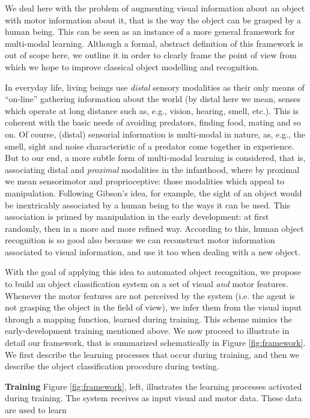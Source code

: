 
We deal here with the problem of augmenting visual information about an object
with motor information about it, that is the way the object can be grasped by
a human being. This can be seen as an instance of a more general framework for
multi-modal learning. Although a formal, abstract definition of this framework
is out of scope here, we outline it in order to clearly frame the point of view
from which we hope to improve classical object modelling and recognition.

In everyday life, living beings use \emph{distal} sensory modalities as their only
means of ``on-line'' gathering information about the world (by distal here we
mean, senses which operate at long distance such as, e.g., vision, hearing,
smell, etc.). This is coherent with the basic needs of avoiding predators,
finding food, mating and so on. Of course, (distal) sensorial information is
multi-modal in nature, as, e.g., the smell, sight and noise characteristic of a
predator come together in experience. But to our end, a more subtle form of multi-modal
learning is considered, that is, associating distal and \emph{proximal} modalities
in the infanthood, where by proximal we mean sensorimotor and proprioceptive: those
modalities which appeal to manipulation. Following Gibson's idea, for example,
the sight of an object would be inextricably associated by a human being to the
ways it can be used. This
association is primed by manipulation in the early development: at first randomly,
then in a more and more refined way. According to this, human object recognition
is so good also because we can reconstruct motor information associated to visual
information, and use it too when dealing with a new object.

With the goal of applying this idea to automated object recognition, we propose to build an object classification system 
on a set of visual {\em and} motor features. Whenever the motor features are not perceived by the system (i.e. the
agent is not grasping the object in the field of view), we infer them from the visual input through 
a mapping function, learned during training. This scheme mimics the early-development training mentioned above.
We now proceed to illustrate in detail our framework, that is summarized schematically in Figure \ref{fig:framework}.
We first describe the learning processes that occur during training, and then we describe the object classification
procedure during testing.

\vspace{0.5cm}
\noindent
{\bf Training} Figure \ref{fig:framework}, left, illustrates the learning processes activated during training. The system receives
as input visual and motor data. These data are used to learn

